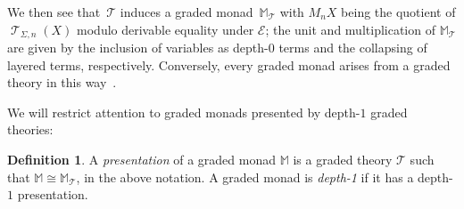 \documentclass[sigconf,
			final%
			nonacm
                        ]{acmart}
\numberwithin{equation}{section}
\numberwithin{equation}{section}
\theoremstyle{plain}
\theoremstyle{definition}
\newtheorem{defn}[thm]{Definition}
\newcommand{\M}{\mathbb{M}}                   %
\newcommand{\T}{\mathcal{T}}                     %
\DeclareMathOperator{\Terms}{\mathscr{T}}
\newcommand{\Termsarg}[1]{\Terms_{\!#1}}
\newcommand{\E}{\mathcal{E}}   %
\begin{document}
We then see that~$\T$ induces a graded monad~$\M_{\T}$ with $M_nX$
being the quotient of $\Termsarg{\Sigma, n}(X)$ modulo derivable
equality under $\E$; the unit and multiplication of $\M_{\T}$ are
given by the inclusion of variables as depth-0 terms and the
collapsing of layered terms, respectively. Conversely, every graded
monad arises from a graded theory in this way~\cite{MPS15}.

We will restrict attention to graded monads presented by depth-$1$
graded theories:

\begin{defn}
  A \emph{presentation} of a graded monad $\M$ is a graded theory $\T$
  such that $\M\cong\M_{\T}$, in the above notation.  A graded monad
  is \emph{depth-1} if it has a depth-$1$ presentation.
\end{defn}
\end{document}
